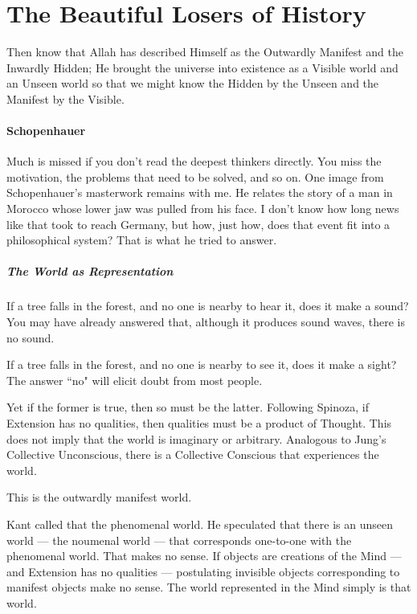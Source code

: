 \section{The Beautiful Losers of History}

\begin{quotex}
Then know that Allah has described Himself as the Outwardly Manifest and the Inwardly Hidden; He brought the universe into existence as a Visible world and an Unseen world so that we might know the Hidden by the Unseen and the Manifest by the Visible. 

\end{quotex}
\paragraph{Schopenhauer}
Much is missed if you don't read the deepest thinkers directly. You miss the motivation, the problems that need to be solved, and so on. One image from Schopenhauer's masterwork remains with me. He relates the story of a man in Morocco whose lower jaw was pulled from his face. I don't know how long news like that took to reach Germany, but how, just how, does that event fit into a philosophical system? That is what he tried to answer.

\subparagraph{The World as Representation}
If a tree falls in the forest, and no one is nearby to hear it, does it make a sound? You may have already answered that, although it produces sound waves, there is no sound.

If a tree falls in the forest, and no one is nearby to see it, does it make a sight? The answer ``no" will elicit doubt from most people.

Yet if the former is true, then so must be the latter. Following Spinoza, if Extension has no qualities, then qualities must be a product of Thought. This does not imply that the world is imaginary or arbitrary. Analogous to Jung's Collective Unconscious, there is a Collective Conscious that experiences the world.

This is the outwardly manifest world.

Kant called that the phenomenal world. He speculated that there is an unseen world — the noumenal world — that corresponds one-to-one with the phenomenal world. That makes no sense. If objects are creations of the Mind — and Extension has no qualities — postulating invisible objects corresponding to manifest objects make no sense. The world represented in the Mind simply is that world.

